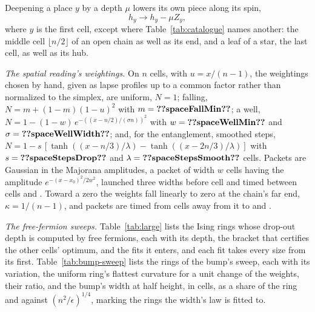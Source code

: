 \documentclass[aps,prd,reprint,superscriptaddress]{revtex4-2}
\begin{document}
Deepening a place $y$ by a depth $\mu$ lowers its own piece along its spin,
\begin{equation}
  h_y \to h_y - \mu Z_y ,
  \label{eq:deepen}
\end{equation}
where $y$ is the first cell, except where Table~\ref{tab:catalogue} names another: the middle cell $\lfloor n/2 \rfloor$ of an open chain as well as its end, and a leaf of a star, the last cell, as well as its hub.

\textit{The spatial reading's weightings.} On $n$ cells, with $u = x/(n-1)$, the weightings chosen by hand, given as lapse profiles up to a common factor rather than normalized to the simplex, are uniform, $N = 1$; falling, $N = m + (1 - m)(1 - u)^2$ with $m = \val{spaceFallMin}$; a well, $N = 1 - (1 - w)\, e^{-((x - n/2)/(\sigma n))^2}$ with $w = \val{spaceWellMin}$ and $\sigma = \val{spaceWellWidth}$; and, for the entanglement, smoothed steps, $N = 1 - s\,[\tanh((x - n/3)/\lambda) - \tanh((x - 2n/3)/\lambda)]$ with $s = \val{spaceStepsDrop}$ and $\lambda = \val{spaceStepsSmooth}$ cells. Packets are Gaussian in the Majorana amplitudes, a packet of width $w$ cells having the amplitude $e^{-(x - x_0)^2/2w^2}$, launched three widths before cell  and timed between cells  and . Toward a zero the weights fall linearly to zero at the chain's far end, $\kappa = 1/(n-1)$, and packets are timed from  cells away from it to  and .

\textit{The free-fermion sweeps.} Table~\ref{tab:large} lists the Ising rings whose drop-out depth is computed by free fermions, each with its depth, the bracket that certifies the other cells' optimum, and the fits it enters, and each fit takes every size from its first. Table~\ref{tab:bump-sweep} lists the rings of the bump's sweep, each with its variation, the uniform ring's flattest curvature for a unit change of the weights, their ratio, and the bump's width at half height, in cells, as a share of the ring and against $(n^2/\epsilon)^{1/4}$, marking the rings the width's law is fitted to.

\begin{table}[tp]
  \caption{The Ising rings computed by free fermions: the drop-out depth, the bracket certifying the other cells' optimum, and the fits each size enters.}
  \label{tab:large}
  \small
  
\end{table}

\begin{table}[tp]
  \caption{The rings of the bump's sweep: size and variation, the uniform ring's flattest curvature and the variation's ratio to it, and the bump's width at half height, in cells, as a share of the ring and against $(n^2/\epsilon)^{1/4}$; the width's law is fitted to the rings marked.}
  \label{tab:bump-sweep}
  \small
  
\end{table}
\end{document}
